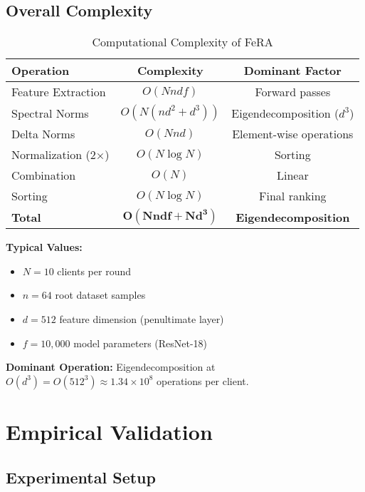 \documentclass[11pt,a4paper]{article}
\begin{document}
\subsection{Overall Complexity}

\begin{table}[h]
\centering
\begin{tabular}{@{}lcc@{}}
\toprule
\textbf{Operation} & \textbf{Complexity} & \textbf{Dominant Factor} \\
\midrule
Feature Extraction & $O(Nndf)$ & Forward passes \\
Spectral Norms & $O(N(nd^2 + d^3))$ & Eigendecomposition ($d^3$) \\
Delta Norms & $O(Nnd)$ & Element-wise operations \\
Normalization (2×) & $O(N \log N)$ & Sorting \\
Combination & $O(N)$ & Linear \\
Sorting & $O(N \log N)$ & Final ranking \\
\midrule
\textbf{Total} & $\mathbf{O(Nndf + Nd^3)}$ & \textbf{Eigendecomposition} \\
\bottomrule
\end{tabular}
\caption{Computational Complexity of FeRA}
\label{tab:complexity}
\end{table}

\textbf{Typical Values:}
\begin{itemize}
    \item $N = 10$ clients per round
    \item $n = 64$ root dataset samples
    \item $d = 512$ feature dimension (penultimate layer)
    \item $f = 10,000$ model parameters (ResNet-18)
\end{itemize}

\textbf{Dominant Operation:} Eigendecomposition at $O(d^3) = O(512^3) \approx 1.34 \times 10^8$ operations per client.

\section{Empirical Validation}

\subsection{Experimental Setup}
\end{document}
